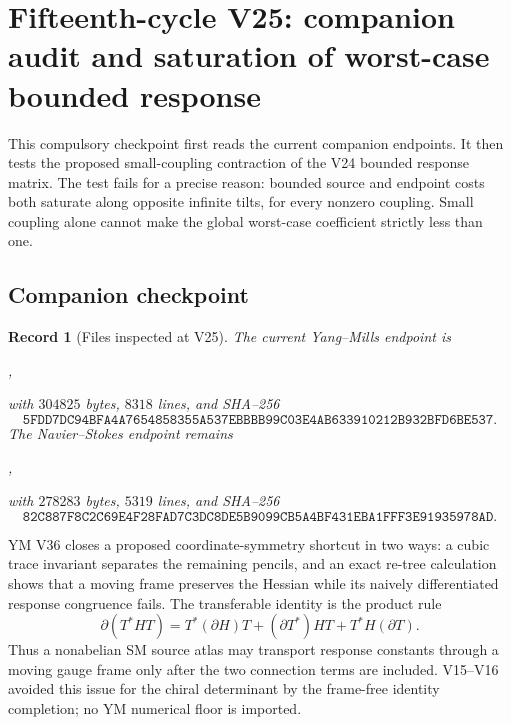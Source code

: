 \documentclass[11pt]{article}
\newtheorem{record}[theorem]{Record}
\theoremstyle{remark}
\begin{document}
\section{Fifteenth-cycle V25: companion audit and saturation of worst-case bounded response}
\label{sec:v15v25}

This compulsory checkpoint first reads the current companion
endpoints.  It then tests the proposed small-coupling contraction of
the V24 bounded response matrix.  The test fails for a precise
reason: bounded source and endpoint costs both saturate along
opposite infinite tilts, for every nonzero coupling.  Small coupling
alone cannot make the global worst-case coefficient strictly less
than one.

\subsection{Companion checkpoint}

\begin{record}[Files inspected at V25]
\label{rec:v15v25-companions}
The current Yang--Mills endpoint is
\begin{center}
,
\end{center}
with \(304825\) bytes, \(8318\) lines, and SHA--256
\[
 \texttt{5FDD7DC94BFA4A7654858355A537EBBBB99C03E4AB633910212B932BFD6BE537}.
                                                               \tag{25.1}
\]
The Navier--Stokes endpoint remains
\begin{center}
,
\end{center}
with \(278283\) bytes, \(5319\) lines, and SHA--256
\[
 \texttt{82C887F8C2C69E4F28FAD7C3DC8DE5B9099CB5A4BF431EBA1FFF3E91935978AD}.
                                                               \tag{25.2}
\]
\end{record}

YM V36 closes a proposed coordinate-symmetry shortcut in two ways:
a cubic trace invariant separates the remaining pencils, and an
exact re-tree calculation shows that a moving frame preserves the
Hessian while its naively differentiated response congruence fails.
The transferable identity is the product rule
\[
 \partial(T^*HT)
 =
 T^*(\partial H)T+
 (\partial T^*)HT+T^*H(\partial T).                         \tag{25.3}
\]
Thus a nonabelian SM source atlas may transport response constants
through a moving gauge frame only after the two connection terms
are included.  V15--V16 avoided this issue for the chiral
determinant by the frame-free identity completion; no YM numerical
floor is imported.
\end{document}

